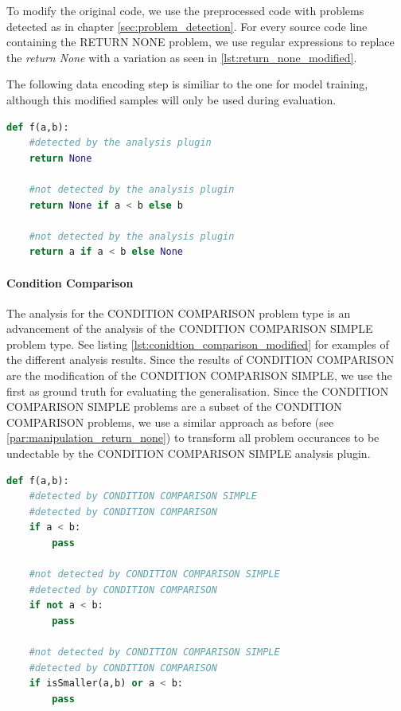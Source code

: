 To modify the original code, we use the preprocessed code with problems detected as in chapter \ref{sec:problem_detection}. For every source code line containing the RETURN NONE problem, we use regular expressions to replace the \textit{return None} with a variation as seen in \ref{lst:return_none_modified}. 

The following data encoding step is similiar to the one for model training, although this modified samples will only be used during evaluation.

\begin{minipage}[c]{\linewidth}
\begin{lstlisting}[language=Python, label=lst:return_none_modified, caption={Samples for returning None. The first return would be flagged by the analysis plugin, the second and third return are modified variations that would be ignored by the analysis plugin. The performance of the machine learning models on detecting the latter will be evaluated.}]
def f(a,b):
    #detected by the analysis plugin
    return None 

    #not detected by the analysis plugin
    return None if a < b else b 

    #not detected by the analysis plugin
    return a if a < b else None \end{lstlisting}
\end{minipage}
\paragraph{Condition Comparison}
The analysis for the CONDITION COMPARISON problem type is an advancement of the analysis of the CONDITION COMPARISON SIMPLE problem type.  See listing \ref{lst:conidtion_comparison_modified} for examples of the different analysis results.
Since the results of CONDITION COMPARISON are the modification of the CONDITION COMPARISON SIMPLE, we use the first as ground truth for evaluating the generalisation. Since the CONDITION COMPARISON SIMPLE problems are a subset of the CONDITION COMPARISON problems, we use a similar approach as before (see \ref{par:manipulation_return_none}) to transform all problem occurances to be undectable by the CONDITION COMPARISON SIMPLE analysis plugin.

\begin{minipage}[c]{0.95\linewidth}
\begin{lstlisting}[language=Python, label=lst:conidtion_comparison_modified, caption={Sample statements for the differnce between the two analysis plugins CONDITION COMPARISON and CONDITION COMPARISON SIMPLE.  }]
    def f(a,b):
    #detected by CONDITION COMPARISON SIMPLE
    #detected by CONDITION COMPARISON
    if a < b:
        pass 

    #not detected by CONDITION COMPARISON SIMPLE
    #detected by CONDITION COMPARISON
    if not a < b:
        pass 

    #not detected by CONDITION COMPARISON SIMPLE
    #detected by CONDITION COMPARISON
    if isSmaller(a,b) or a < b:
        pass \end{lstlisting}
\end{minipage}

